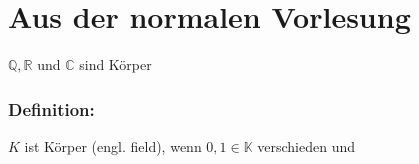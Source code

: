 \section{Aus der normalen Vorlesung}
$\mathbb{Q},\mathbb{R}$ und $\mathbb{C}$ sind Körper\\
%
%
%
\subsubsection{Definition:}
$K$ ist Körper (engl. field), wenn $0,1 \in \mathbb{K}$ verschieden und 